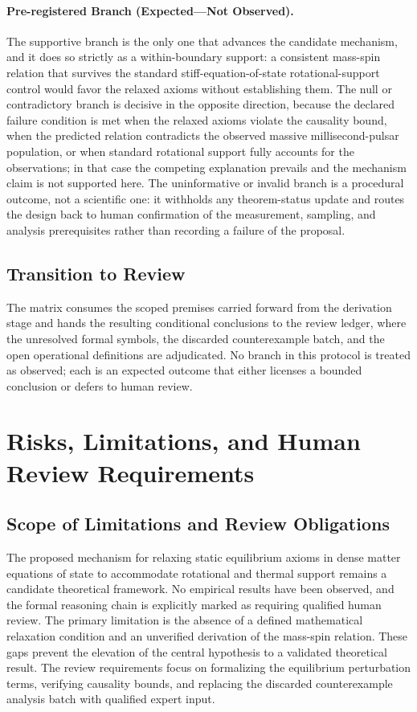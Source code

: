 \documentclass[conference]{IEEEtran}
\begin{document}
\paragraph{Pre-registered Branch (Expected---Not Observed).} The supportive branch is the only one that advances the candidate mechanism, and it does so strictly as a within-boundary support: a consistent mass-spin relation that survives the standard stiff-equation-of-state rotational-support control would favor the relaxed axioms without establishing them. The null or contradictory branch is decisive in the opposite direction, because the declared failure condition is met when the relaxed axioms violate the causality bound, when the predicted relation contradicts the observed massive millisecond-pulsar population, or when standard rotational support fully accounts for the observations; in that case the competing explanation prevails and the mechanism claim is not supported here. The uninformative or invalid branch is a procedural outcome, not a scientific one: it withholds any theorem-status update and routes the design back to human confirmation of the measurement, sampling, and analysis prerequisites rather than recording a failure of the proposal.

\subsection{Transition to Review}
The matrix consumes the scoped premises carried forward from the derivation stage and hands the resulting conditional conclusions to the review ledger, where the unresolved formal symbols, the discarded counterexample batch, and the open operational definitions are adjudicated. No branch in this protocol is treated as observed; each is an expected outcome that either licenses a bounded conclusion or defers to human review.

\section{Risks, Limitations, and Human Review Requirements}
\subsection{Scope of Limitations and Review Obligations}
The proposed mechanism for relaxing static equilibrium axioms in dense matter equations of state to accommodate rotational and thermal support remains a candidate theoretical framework. No empirical results have been observed, and the formal reasoning chain is explicitly marked as requiring qualified human review. The primary limitation is the absence of a defined mathematical relaxation condition and an unverified derivation of the mass-spin relation. These gaps prevent the elevation of the central hypothesis to a validated theoretical result. The review requirements focus on formalizing the equilibrium perturbation terms, verifying causality bounds, and replacing the discarded counterexample analysis batch with qualified expert input.
\end{document}
